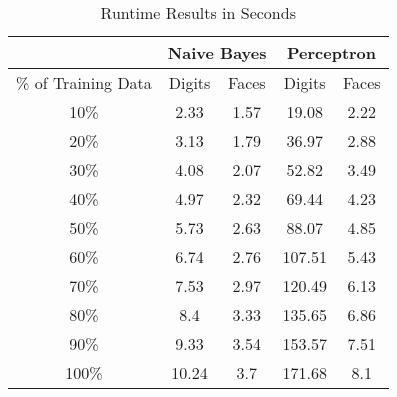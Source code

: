 \documentclass{article}
\begin{document}
\begin{table}[!htb]
	\centering
	\caption{Runtime Results in Seconds}
	\begin{tabular}{|*{5}{c|}|}
		\hline
		& \multicolumn{2}{c|}{Naive Bayes} & \multicolumn{2}{c|}{Perceptron}  \\
		\hline
		\% of Training Data & Digits & Faces & Digits & Faces \\
		\hline
		10\%  & 2.33  & 1.57  & 19.08 & 2.22 \\
		20\%  & 3.13  & 1.79  & 36.97 & 2.88 \\
		30\%  & 4.08  & 2.07  & 52.82 & 3.49 \\
		40\%  & 4.97  & 2.32  & 69.44 & 4.23 \\
		50\%  & 5.73  & 2.63  & 88.07 & 4.85 \\
		60\%  & 6.74  & 2.76  & 107.51 & 5.43 \\
		70\%  & 7.53  & 2.97  & 120.49 & 6.13 \\
		80\%  & 8.4   & 3.33  & 135.65 & 6.86 \\
		90\%  & 9.33  & 3.54  & 153.57 & 7.51 \\
		100\% & 10.24 & 3.7   & 171.68 & 8.1 \\
		\hline
	\end{tabular}%
\end{table}%
\end{document}
